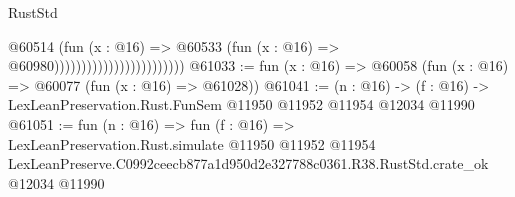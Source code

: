 \begin{lexlean}{RustStd}
\begin{coremodule}
                                              @60514
                                                (fun (x : @16) =>
                                                @60533
                                                  (fun (x : @16) => @60980))))))))))))))))))))))))
@61033 := fun (x : @16) => @60058 (fun (x : @16) => @60077 (fun (x : @16) => @61028))
@61041 := (n : @16) ->
  (f : @16) -> LexLeanPreservation.Rust.FunSem @11950 @11952 @11954 @12034 @11990
@61051 := fun (n : @16) =>
  fun (f : @16) =>
  LexLeanPreservation.Rust.simulate
    @11950
    @11952
    @11954
    LexLeanPreserve.C0992ceecb877a1d950d2e327788c0361.R38.RustStd.crate_ok
    @12034
    @11990
\end{coremodule}
\end{lexlean}
